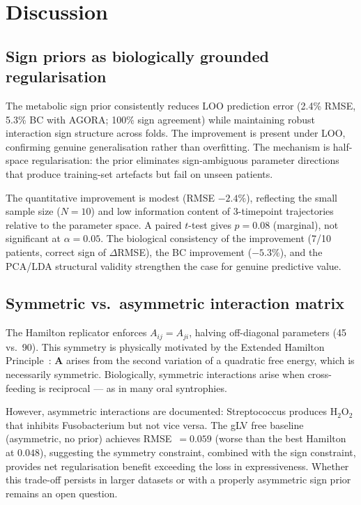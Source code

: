 \documentclass[11pt,a4paper]{article}
\newcommand{\bA}{\mathbf{A}}
\begin{document}
\section{Discussion}
\label{sec:discussion}

\subsection{Sign priors as biologically grounded regularisation}
\label{ssec:disc_prior}

The metabolic sign prior consistently reduces LOO prediction error (2.4\% RMSE,
5.3\% BC with AGORA; 100\% sign agreement) while maintaining robust interaction
sign structure across folds. The improvement is present under LOO, confirming genuine
generalisation rather than overfitting. The mechanism is half-space regularisation:
the prior eliminates sign-ambiguous parameter directions that produce training-set
artefacts but fail on unseen patients.

The quantitative improvement is modest (RMSE $-2.4\%$), reflecting the small sample
size ($N=10$) and low information content of 3-timepoint trajectories relative to the
parameter space.
A paired $t$-test gives $p=0.08$ (marginal), not significant at $\alpha=0.05$.
The biological consistency of the improvement (7/10 patients, correct sign of $\Delta$RMSE),
the BC improvement ($-5.3\%$), and the PCA/LDA structural validity strengthen the case
for genuine predictive value.

\subsection{Symmetric vs.\ asymmetric interaction matrix}
\label{ssec:disc_sym}

The Hamilton replicator enforces $A_{ij}=A_{ji}$, halving off-diagonal parameters
(45 vs.\ 90). This symmetry is physically motivated by the Extended Hamilton
Principle~\citep{junker2021, klempt2024}: $\bA$ arises from the second variation of a
quadratic free energy, which is necessarily symmetric. Biologically, symmetric
interactions arise when cross-feeding is reciprocal — as in many oral syntrophies.

However, asymmetric interactions are documented: Streptococcus produces $\text{H}_2\text{O}_2$
that inhibits Fusobacterium but not vice versa. The gLV free baseline (asymmetric,
no prior) achieves RMSE~$=0.059$ (worse than the best Hamilton at $0.048$), suggesting
the symmetry constraint, combined with the sign constraint, provides net regularisation
benefit exceeding the loss in expressiveness. Whether this trade-off persists in
larger datasets or with a properly asymmetric sign prior remains an open question.
\end{document}
